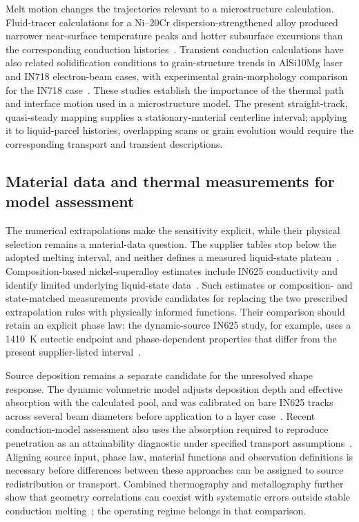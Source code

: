 Melt motion changes the trajectories relevant to a microstructure calculation. Fluid-tracer calculations for a Ni--20Cr dispersion-strengthened alloy produced narrower near-surface temperature peaks and hotter subsurface excursions than the corresponding conduction histories~\cite{Hou2024Dissolution}. Transient conduction calculations have also related solidification conditions to grain-structure trends in AlSi10Mg laser and IN718 electron-beam cases, with experimental grain-morphology comparison for the IN718 case~\cite{Plotkowski2017Rapid}. These studies establish the importance of the thermal path and interface motion used in a microstructure model. The present straight-track, quasi-steady mapping supplies a stationary-material centerline interval; applying it to liquid-parcel histories, overlapping scans or grain evolution would require the corresponding transport and transient descriptions.

\subsection{Material data and thermal measurements for model assessment}
The numerical extrapolations make the sensitivity explicit, while their physical selection remains a material-data question. The supplier tables stop below the adopted melting interval, and neither defines a measured liquid-state plateau~\cite{specialmetals625}. Composition-based nickel-superalloy estimates include IN625 conductivity and identify limited underlying liquid-state data~\cite{mills2006}. Such estimates or composition- and state-matched measurements provide candidates for replacing the two prescribed extrapolation rules with physically informed functions. Their comparison should retain an explicit phase law: the dynamic-source IN625 study, for example, uses a 1410~K eutectic endpoint and phase-dependent properties that differ from the present supplier-listed interval~\cite{dynamic2024}.

Source deposition remains a separate candidate for the unresolved shape response. The dynamic volumetric model adjusts deposition depth and effective absorption with the calculated pool, and was calibrated on bare IN625 tracks across several beam diameters before application to a layer case~\cite{dynamic2024}. Recent conduction-model assessment also uses the absorption required to reproduce penetration as an attainability diagnostic under specified transport assumptions~\cite{hong2026}. Aligning source input, phase law, material functions and observation definitions is necessary before differences between these approaches can be assigned to source redistribution or transport. Combined thermography and metallography further show that geometry correlations can coexist with systematic errors outside stable conduction melting~\cite{soares2026}; the operating regime belongs in that comparison.

